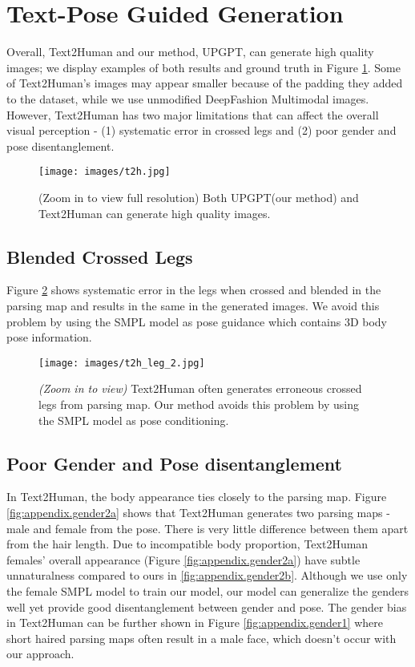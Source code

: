 \documentclass[10pt,twocolumn,letterpaper]{article}
\begin{document}
\newpage
\section{Text-Pose Guided Generation}\label{sec:A}
\setcounter{figure}{0} 
Overall, Text2Human and our method, UPGPT, can generate high quality images; we display examples of both results and ground truth in Figure \ref{fig:appendix.t2h_1}. Some of Text2Human's images may appear smaller because of the padding they added to the dataset, while we use unmodified DeepFashion Multimodal images. However, Text2Human has two major limitations that can affect the overall visual perception - (1) systematic error in crossed legs and (2) poor gender and pose disentanglement.
\begin{figure}[h]
    \begin{center}
        \texttt{[image: images/t2h.jpg]}
    \end{center}
\caption{(Zoom in to view full resolution) Both UPGPT(our method) and Text2Human can generate high quality images.} 
\label{fig:appendix.t2h_1}
\end{figure}
\newpage
\subsection{Blended Crossed Legs}
Figure \ref{fig:appendix.leg} shows systematic error in the legs when crossed and blended in the parsing map and results in the same in the generated images. We avoid this problem by using the SMPL model as pose guidance which contains 3D body pose information. 

\begin{figure}[h]
    \begin{center}
        \texttt{[image: images/t2h\_leg\_2.jpg]}
    \end{center}
\caption{\textit{(Zoom in to view)} Text2Human often generates erroneous crossed legs from parsing map. Our method avoids this problem by using the SMPL model as pose conditioning.}
\label{fig:appendix.leg}
\end{figure}

\subsection{Poor Gender and Pose disentanglement}
In Text2Human, the body appearance ties closely to the parsing map. Figure \ref{fig:appendix.gender2a} shows that Text2Human generates two parsing maps - male and female from the pose. There is very little difference between them apart from the hair length. Due to incompatible body proportion, Text2Human females' overall appearance (Figure \ref{fig:appendix.gender2a}) have subtle unnaturalness compared to ours in \ref{fig:appendix.gender2b}. Although we use only the female SMPL model to train our model, our model can generalize the genders well yet provide good disentanglement between gender and pose. The gender bias in Text2Human can be further shown in Figure \ref{fig:appendix.gender1} where short haired parsing maps often result in a male face, which doesn't occur with our approach.
\end{document}

